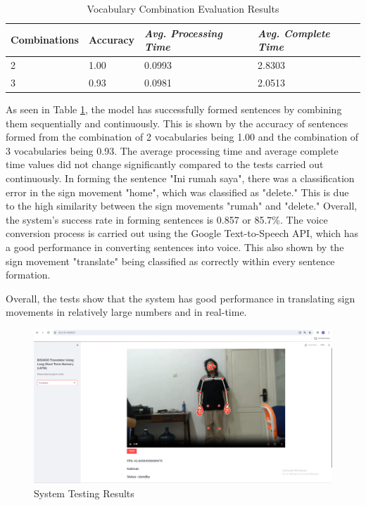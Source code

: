 \begin{table}[H]
  \caption{Vocabulary Combination Evaluation Results}
  \label{tb:combinationevaluation}
  \centering
  \begin{tabular}{llll}
    \hline
    \textbf{Combinations} & \textbf{Accuracy} & \emph{\textbf{Avg. Processing Time}} & \emph{\textbf{Avg. Complete Time}} \\
    \hline
    2  & 1.00 & 0.0993 & 2.8303 \\
    3  & 0.93 & 0.0981 & 2.0513 \\
    \hline
  \end{tabular}
\end{table}

As seen in Table \ref{tb:combinationevaluation}, the model has successfully formed sentences by combining them sequentially and continuously. This is shown by the accuracy of sentences formed from the combination of 2 vocabularies being 1.00 and the combination of 3 vocabularies being 0.93. The average processing time and average complete time values did not change significantly compared to the tests carried out continuously. In forming the sentence "Ini rumah saya", there was a classification error in the sign movement "home", which was classified as "delete." This is due to the high similarity between the sign movements "rumah" and "delete." Overall, the system's success rate in forming sentences is 0.857 or 85.7\%. The voice conversion process is carried out using the Google Text-to-Speech API, which has a good performance in converting sentences into voice. This also shown by the sign movement "translate" being classified as correctly within every sentence formation.

Overall, the tests show that the system has good performance in translating sign movements in relatively large numbers and in real-time.

\begin{figure}[ht]
    \centering
    \includegraphics[scale=0.12]{gambar/bab3-layoutweb.png}
    \caption{System Testing Results}
    \label{fig:layoutweb}
\end{figure}
